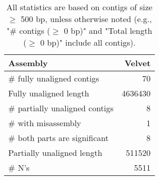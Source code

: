 \documentclass[12pt,a4paper]{article}
\begin{document}
\begin{table}[ht]
\begin{center}
\caption{All statistics are based on contigs of size $\geq$ 500 bp, unless otherwise noted (e.g., "\# contigs ($\geq$ 0 bp)" and "Total length ($\geq$ 0 bp)" include all contigs).}
\begin{tabular}{|l*{1}{|r}|}
\hline
Assembly & Velvet \\ \hline
\# fully unaligned contigs & 70 \\ \hline
Fully unaligned length & 4636430 \\ \hline
\# partially unaligned contigs & 8 \\ \hline
\hspace{5mm}\# with misassembly & 1 \\ \hline
\hspace{5mm}\# both parts are significant & 8 \\ \hline
Partially unaligned length & 511520 \\ \hline
\# N's & 5511 \\ \hline
\end{tabular}
\end{center}
\end{table}
\end{document}
